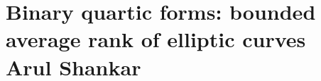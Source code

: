 \chapter{Binary quartic forms:  bounded average rank of elliptic curves \\ Arul Shankar}\label{ch:22}